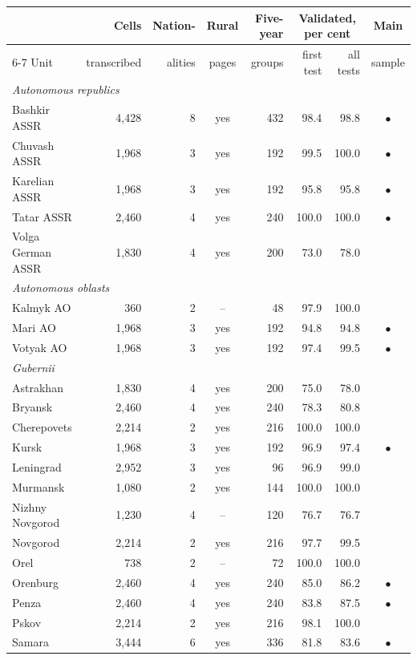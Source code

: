 \begin{tabular}{lrrcrrrc}
\toprule
 & Cells & Nation- & Rural & Five-year & \multicolumn{2}{c}{Validated, per cent} & Main \\
\cmidrule(lr){6-7}
Unit & transcribed & alities & pages & groups & first test & all tests & sample \\
\midrule
\multicolumn{8}{l}{\textit{Autonomous republics}} \\
Bashkir ASSR & 4,428 & 8 & yes & 432 & 98.4 & 98.8 & $\bullet$ \\
Chuvash ASSR & 1,968 & 3 & yes & 192 & 99.5 & 100.0 & $\bullet$ \\
Karelian ASSR & 1,968 & 3 & yes & 192 & 95.8 & 95.8 & $\bullet$ \\
Tatar ASSR & 2,460 & 4 & yes & 240 & 100.0 & 100.0 & $\bullet$ \\
Volga German ASSR & 1,830 & 4 & yes & 200 & 73.0 & 78.0 &  \\
\multicolumn{8}{l}{\textit{Autonomous oblasts}} \\
Kalmyk AO & 360 & 2 & -- & 48 & 97.9 & 100.0 &  \\
Mari AO & 1,968 & 3 & yes & 192 & 94.8 & 94.8 & $\bullet$ \\
Votyak AO & 1,968 & 3 & yes & 192 & 97.4 & 99.5 & $\bullet$ \\
\multicolumn{8}{l}{\textit{\emph{Gubernii}}} \\
Astrakhan & 1,830 & 4 & yes & 200 & 75.0 & 78.0 &  \\
Bryansk & 2,460 & 4 & yes & 240 & 78.3 & 80.8 &  \\
Cherepovets & 2,214 & 2 & yes & 216 & 100.0 & 100.0 &  \\
Kursk & 1,968 & 3 & yes & 192 & 96.9 & 97.4 & $\bullet$ \\
Leningrad & 2,952 & 3 & yes & 96 & 96.9 & 99.0 &  \\
Murmansk & 1,080 & 2 & yes & 144 & 100.0 & 100.0 &  \\
Nizhny Novgorod & 1,230 & 4 & -- & 120 & 76.7 & 76.7 &  \\
Novgorod & 2,214 & 2 & yes & 216 & 97.7 & 99.5 &  \\
Orel & 738 & 2 & -- & 72 & 100.0 & 100.0 &  \\
Orenburg & 2,460 & 4 & yes & 240 & 85.0 & 86.2 & $\bullet$ \\
Penza & 2,460 & 4 & yes & 240 & 83.8 & 87.5 & $\bullet$ \\
Pskov & 2,214 & 2 & yes & 216 & 98.1 & 100.0 &  \\
Samara & 3,444 & 6 & yes & 336 & 81.8 & 83.6 & $\bullet$ \\

\end{tabular}
